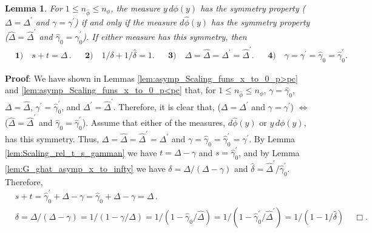 \documentclass[english,12pt,jmp,graphicx]{revtex4-1}
\newtheorem{lemma}{Lemma}[section]
\newcommand{\ph}{\hat{\phi}}
\newcommand{\gh}{\hat{\gamma}}
\newcommand{\Dh}{\hat{\Delta}}
\newcommand{\dha}{\hat{\delta}}
\begin{document}
%
\begin{lemma}\label{lem:s_t}
  For $1\leq n_{\ph}\leq n_{\phi}$, the measure $y\,d\phi(y)$ has the symmetry
  property ($\Delta=\Delta^\prime$ and $\gamma=\gamma^\prime$) if and only if the measure $d\ph(y)$
  has the symmetry property ($\Dh=\Dh^\prime$ and $\gh_0=\gh_0^\prime$). If
  either measure has this symmetry, then  
  \begin{align*}    
    &\mathbf{1)} \quad s+t=\Delta\,. &&
    \mathbf{2)} \quad 1/\delta+1/\dha=1.&&
    \mathbf{3)} \quad \Delta=\Dh=\Delta^\prime=\Dh^\prime.&&
    \mathbf{4)} \quad \gamma=\gamma^\prime=\gh_0=\gh_0^\prime.
   \end{align*}
 \end{lemma}
%
\noindent \textbf{Proof}:
%
We have shown in Lemmas
\ref{lem:asymp_Scaling_funs_x_to_0_p>pc} and
\ref{lem:asymp_Scaling_funs_x_to_0_p<pc}  
that, for $1\leq n_{\ph}\leq n_{\phi}$, $\gamma=\gh_0$, $\Delta=\Dh$, $\gamma^\prime=\gh_0^\prime$, and $\Delta^\prime=\Dh^\prime$. Therefore, it
is clear that, ($\Delta=\Delta^\prime$ and $\gamma=\gamma^\prime$) $\iff$ ($\Dh=\Dh^\prime$ and
$\gh_0=\gh_0^\prime$). Assume that either of the measures, $d\ph(y)$
or $y\,d\phi(y)$, has this symmetry. Thus, $\Delta=\Dh=\Dh^\prime=\Delta^\prime$ and
$\gamma=\gh_0=\gh_0^\prime=\gamma^\prime$. By
Lemma \ref{lem:Scaling_rel_t_s_gamman} we have $t=\Delta-\gamma$ and
$s=\gh_0^\prime$, and by Lemma \ref{lem:G_ghat_asymp_x_to_infty} we have
$\delta=\Delta/(\Delta-\gamma)$ and $\dha=\Dh^\prime/\gh_0^\prime$. Therefore,    
%
\begin{align*}
  &s+t=\gh_0^\prime+\Delta-\gamma=\gh_0+\Delta-\gamma=\Delta\,.\\
  &\delta=\Delta/(\Delta-\gamma)=1/(1-\gamma/\Delta)=1/(1-\gh_0/\Dh)=1/(1-\gh_0^\prime/\Dh^\prime)=1/(1-1/\dha)\,
  \quad \Box.
\end{align*}
\end{document}
